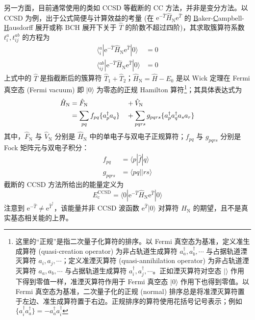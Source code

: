 另一方面，目前通常使用的类如 CCSD 等截断的 CC 方法，并非是变分方法。以 CCSD 为例，出于公式简便与计算效益的考量 (在 $\mathrm{e}^{-\hat T} \hat H_\mathrm{N} \mathrm{e}^{\hat T}$ 的 \underline{B}aker-\underline{C}ampbell-\underline{H}ausdorff 展开或称 BCH 展开下关于 $\hat T$ 的阶数不超过四阶)，其求取簇算符系数 $t_i^a, t_{ij}^{ab}$ 的方程为
\begin{align}
  \langle {}_i^a | \mathrm{e}^{-\hat T} \hat H_\mathrm{N} \mathrm{e}^{\hat T} | 0 \rangle &= 0 \\
  \label{eq.2.ccsd-t2amplitude}
  \langle {}_{ij}^{ab} | \mathrm{e}^{-\hat T} \hat H_\mathrm{N} \mathrm{e}^{\hat T} | 0 \rangle &= 0
\end{align}
上式中的 $\hat T$ 是指截断后的簇算符 $\hat T_1 + \hat T_2$；$\hat H_\mathrm{N} = \hat H - E_0$ 是以 Wick 定理在 Fermi 真空态 (Fermi vacuum) 即 $| 0 \rangle$ 为零态的正规 Hamilton 算符\footnote{这里的“正规”是指二次量子化算符的排序。以 Fermi 真空态为基准，定义准生成算符 (quasi-creation operator) 为非占轨道生成算符 $a_a^\dagger, a_b^\dagger, \cdots$ 与占据轨道湮灭算符 $a_i, a_j, \cdots$；定义准湮灭算符 (quasi-annihilation operator) 为非占轨道湮灭算符 $a_a, a_b, \cdots$ 与占据轨道生成算符 $a_i^\dagger, a_j^\dagger, \cdots$。正如湮灭算符对空态 $| \rangle$ 作用下得到零值一样，准湮灭算符作用于 Fermi 真空态 $| 0 \rangle$ 作用下也得到零值。以 Fermi 真空态为基准，二次量子化的正规 (normal) 排序总是将准湮灭算符置于左边、准生成算符置于右边。正规排序的算符使用花括号记号表示；例如 $\{a_i^\dagger a_a^\dagger\} = - a_a^\dagger a_i^\dagger$}；其具体表达式为
\begin{alignat}{10}
  \label{eq.2.norm-hamiltonian}
  \hat H_\mathrm{N} &= \hat F_\mathrm{N} &&+ \hat V_\mathrm{N} \notag\\
  &= \sum_{pq} f_{pq} \{ a_p^\dagger a_q \} &&+ \sum_{pqrs} g_{pqrs} \{ a_p^\dagger a_q^\dagger a_s a_r \}
\end{alignat}
其中，$\hat F_\mathrm{N}$ 与 $\hat V_\mathrm{N}$ 分别是 $\hat H_\mathrm{N}$ 中的单电子与双电子正规算符；$f_{pq}$ 与 $g_{pqrs}$ 分别是 Fock 矩阵元与双电子积分：
\begin{align}
  f_{pq} &= \langle p | \hat f | q \rangle \\
  g_{pqrs} &= \langle pq || rs \rangle
\end{align}
截断的 CCSD 方法所给出的能量定义为
\begin{equation}
  \label{eq.2.ccsd-energy}
  E_\mathrm{c}^\mathrm{CCSD} = \langle 0 | \mathrm{e}^{-\hat T} \hat H_\mathrm{N} \mathrm{e}^{\hat T} | 0 \rangle
\end{equation}
注意到 $\mathrm{e}^{- \hat T} \neq \mathrm{e}^{\hat T^\dagger}$，该能量并非 CCSD 波函数 $\mathrm{e}^{\hat T} | 0 \rangle$ 对算符 $\hat H_\mathrm{N}$ 的期望，且不是真实基态相关能的上界。

